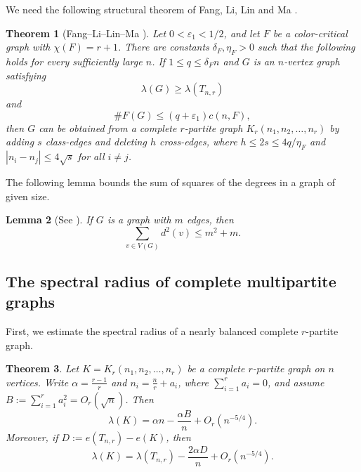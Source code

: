 \documentclass[11pt,a4paper]{article}
\newtheorem{theorem}{Theorem}[section]
\newtheorem{lemma}[theorem]{Lemma}
\theoremstyle{definition}
\theoremstyle{plain}
\renewcommand{\le}{\leqslant}
\renewcommand{\ge}{\geqslant}
\begin{document}
\label{sec:prelim}

We need the following structural theorem of 
Fang, Li, Lin and Ma \cite{FLLM2025}.

\begin{theorem}[Fang--Li--Lin--Ma \cite{FLLM2025}]
\label{thm:FLLM}
Let $0<\varepsilon_1<1/2$, and let $F$ be a color-critical graph  with $\chi(F)=r+1$. There are constants
$\delta_F,\eta_F>0$ such that the following holds for every sufficiently large $n$.
If $  1\le q\le \delta_F n$ 
and $G$ is an $n$-vertex graph satisfying
\[
        \lambda(G)\ge \lambda(T_{n,r})
\]
and
\[
        \texttt{\#} F(G)\le (q+\varepsilon_1)c(n,F),
\]
then $G$ can be obtained from a complete $r$-partite graph $  K_r(n_1,n_2,\ldots,n_r)$ 
by adding $s$ class-edges and deleting $h$ cross-edges, where $  h\le 2s\le {4q}/{\eta_F} $ and 
$|n_i-n_j|\le 4\sqrt{s}$ for all $i\neq j$.  
\end{theorem}





The following lemma bounds 
 the sum of squares of the degrees in a graph of given size.  
  
 \begin{lemma}[See \cite{NZ2021b}] \label{lem-deg-squ}
If $G$ is a graph with $m$ edges, then  
\[  \sum_{v\in V(G)}d^2(v) \le m^2 +m. \]  
 \end{lemma} 


\subsection{The spectral radius of complete multipartite graphs}

First, we estimate the spectral radius of a nearly balanced complete
$r$-partite graph. 



\begin{theorem} 
\label{thm:multipartite-expansion}
Let $  K=K_r(n_1,n_2,\ldots,n_r)$ 
be a complete $r$-partite graph on $n$ vertices. 
Write $\alpha= \frac{r-1}{r}$ and $  n_i=\frac nr+a_i$, where $\sum_{i=1}^r a_i=0$, and assume $ B:=\sum_{i=1}^r a_i^2=O_r(\sqrt n)$. 
Then
\begin{equation}
        \lambda(K)
    =\alpha n-\frac{\alpha B}{n}+O_r(n^{-5/4}). 
        \label{eq:multipartite-expansion}
\end{equation}
Moreover, if $ D:=e(T_{n,r})-e(K)$, 
then
\begin{equation*}
        \lambda(K)
        =\lambda(T_{n,r})-\frac{2\alpha D}{n}+O_r(n^{-5/4}). 
\end{equation*}
\end{theorem}
\end{document}
